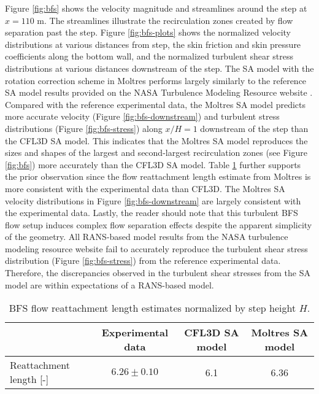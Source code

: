 Figure \ref{fig:bfs} shows the velocity magnitude and streamlines around the step at $x=110$ m. The
streamlines illustrate the recirculation zones created by flow separation past the step.
Figure \ref{fig:bfs-plots} shows the normalized velocity distributions at various distances from
step, the skin friction and skin pressure coefficients along the bottom wall, and the normalized
turbulent shear stress distributions at various distances downstream of the step. The \gls{SA}
model with the rotation correction scheme in Moltres performs largely similarly to the reference
\gls{SA} model results provided on the \gls{NASA} Turbulence Modeling Resource website
\cite{rumsey_turbulence_nodate}. Compared with the reference experimental data, the Moltres
\gls{SA} model predicts more accurate velocity (Figure \ref{fig:bfs-downstream}) and turbulent
stress distributions (Figure \ref{fig:bfs-stress}) along $x/H=1$ downstream of the
step than the CFL3D \gls{SA} model. This indicates that the Moltres
\gls{SA} model reproduces the sizes and shapes of the largest and second-largest recirculation
zones (see Figure \ref{fig:bfs}) more accurately than the CFL3D \gls{SA} model. Table
\ref{table:bfs-reattach} further supports the prior observation since the flow reattachment length
estimate from Moltres is more consistent with the experimental data than CFL3D. The Moltres
\gls{SA} velocity distributions in Figure \ref{fig:bfs-downstream} are largely consistent with the
experimental data. Lastly, the reader should
note that this turbulent \gls{BFS} flow setup induces complex flow separation effects despite the
apparent simplicity of the geometry. All \gls{RANS}-based model results from the \gls{NASA}
turbulence modeling resource website \cite{rumsey_turbulence_nodate} fail to accurately reproduce
the turbulent shear stress distribution (Figure \ref{fig:bfs-stress}) from the reference
experimental data. Therefore, the discrepancies observed in the turbulent shear stresses from the
\gls{SA} model are within expectations of a \gls{RANS}-based model.

\begin{table}[htb]
  \centering
  \small
  \caption{\gls{BFS} flow reattachment length estimates normalized by step height $H$.}
  \begin{tabular}{l c c c}
    \toprule
    & {Experimental data \cite{driver_features_1985}} & {CFL3D \gls{SA} model
  \cite{rumsey_turbulence_nodate}} & {Moltres \gls{SA} model} \\
    \midrule
    Reattachment length [-] & {$6.26 \pm 0.10$} & 6.1 & 6.36 \\
    \bottomrule
  \end{tabular}
  \label{table:bfs-reattach}
\end{table}

